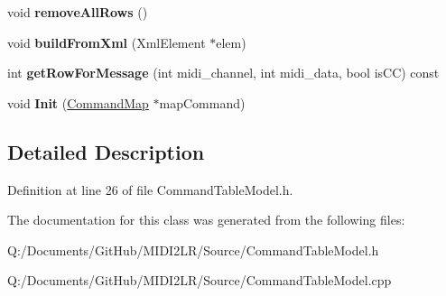 \begin{DoxyCompactItemize}
\item 
void {\bfseries remove\+All\+Rows} ()\hypertarget{class_command_table_model_aa49fc1e19a98cd9c315d0faa5592758b}{}\label{class_command_table_model_aa49fc1e19a98cd9c315d0faa5592758b}

\item 
void {\bfseries build\+From\+Xml} (Xml\+Element $\ast$elem)\hypertarget{class_command_table_model_a6e319303b8e10392dec65e70607d8998}{}\label{class_command_table_model_a6e319303b8e10392dec65e70607d8998}

\item 
int {\bfseries get\+Row\+For\+Message} (int midi\+\_\+channel, int midi\+\_\+data, bool is\+CC) const \hypertarget{class_command_table_model_a718bd444e2e6a23b7ca4375ac3a94b39}{}\label{class_command_table_model_a718bd444e2e6a23b7ca4375ac3a94b39}

\item 
void {\bfseries Init} (\hyperlink{class_command_map}{Command\+Map} $\ast$map\+Command)\hypertarget{class_command_table_model_a8d9162b964812e0bb75d853abc980db8}{}\label{class_command_table_model_a8d9162b964812e0bb75d853abc980db8}

\end{DoxyCompactItemize}


\subsection{Detailed Description}


Definition at line 26 of file Command\+Table\+Model.\+h.



The documentation for this class was generated from the following files\+:\begin{DoxyCompactItemize}
\item 
Q\+:/\+Documents/\+Git\+Hub/\+M\+I\+D\+I2\+L\+R/\+Source/Command\+Table\+Model.\+h\item 
Q\+:/\+Documents/\+Git\+Hub/\+M\+I\+D\+I2\+L\+R/\+Source/Command\+Table\+Model.\+cpp\end{DoxyCompactItemize}
